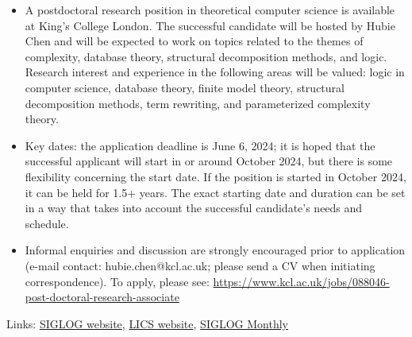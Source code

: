 \documentclass[prodmode,acmtecs]{acmsmall} %
\begin{document}
\begin{itemize}\item  A postdoctoral research position in theoretical computer science is available at King's College London. The successful candidate will be hosted by Hubie Chen and will be expected to work on topics related to the themes of complexity, database theory, structural decomposition methods, and logic. Research interest and experience in the following areas will be valued: logic in computer science, database theory, finite model theory, structural decomposition methods, term rewriting, and parameterized complexity theory. 
 
\item  Key dates: the application deadline is June 6, 2024; it is hoped that the successful applicant will start in or around October 2024, but there is some flexibility concerning the start date. If the position is started in October 2024, it can be held for 1.5+ years. The exact starting date and duration can be set in a way that takes into account the successful candidate's needs and schedule. 
 
\item  Informal enquiries and discussion are strongly encouraged prior to application (e-mail contact: hubie.chen@kcl.ac.uk; please send a CV when initiating correspondence). To apply, please see: \href{https://www.kcl.ac.uk/jobs/088046-post-doctoral-research-associate}{https://www.kcl.ac.uk/jobs/088046-post-doctoral-research-associate} 
 
\end{itemize}


\bigskip Links: \href{http://siglog.org/}{SIGLOG website}, \href{https://lics.siglog.org}{LICS website}, \href{https://lics.siglog.org/newsletters/}{SIGLOG Monthly}
\end{document}
